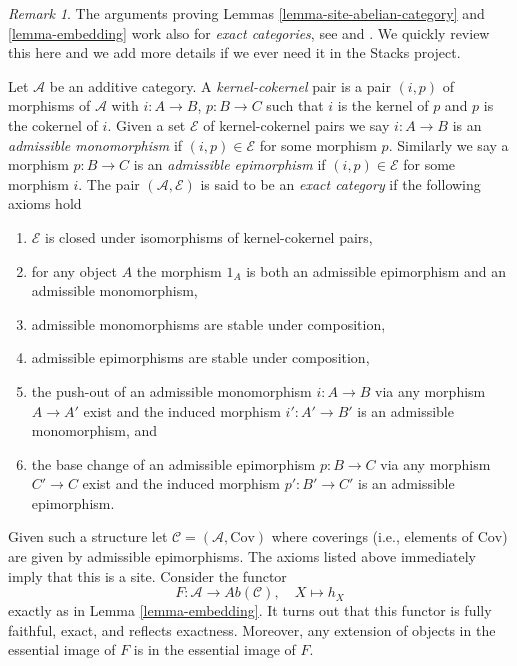 \documentclass{stacks-project}
\theoremstyle{plain}
\theoremstyle{definition}
\theoremstyle{remark}
\newtheorem{remark}[subsection]{Remark}
\numberwithin{equation}{subsection}
\begin{document}
\begin{remark}
\label{remark-embed-exact-category}
The arguments proving
Lemmas \ref{lemma-site-abelian-category} and
\ref{lemma-embedding}
work also for {\it exact categories}, see
\cite[Appendix A]{Buhler} and
\cite[1.1.4]{BBD}.
We quickly review this here and we add more details if we ever
need it in the Stacks project.

\medskip\noindent
Let $\mathcal{A}$ be an additive category.
A {\it kernel-cokernel} pair is a pair $(i, p)$
of morphisms of $\mathcal{A}$ with
$i : A \to B$, $p : B \to C$ such that $i$ is the kernel of
$p$ and $p$ is the cokernel of $i$.
Given a set $\mathcal{E}$ of kernel-cokernel pairs we say
$i : A \to B$ is an {\it admissible monomorphism}
if $(i, p) \in \mathcal{E}$ for some morphism $p$.
Similarly we say a morphism $p : B \to C$ is an {\it admissible epimorphism}
if $(i, p) \in \mathcal{E}$ for some morphism $i$.
The pair $(\mathcal{A}, \mathcal{E})$ is said to be an
{\it exact category} if the following axioms hold
\begin{enumerate}
\item $\mathcal{E}$ is closed under isomorphisms of kernel-cokernel
pairs,
\item for any object $A$ the morphism $1_A$ is both an admissible epimorphism
and an admissible monomorphism,
\item admissible monomorphisms are stable under composition,
\item admissible epimorphisms are stable under composition,
\item the push-out of an admissible monomorphism $i : A \to B$ via
any morphism $A \to A'$ exist and the induced morphism $i' : A' \to B'$
is an admissible monomorphism, and
\item the base change of an admissible epimorphism $p : B \to C$ via
any morphism $C' \to C$ exist and the induced morphism $p' : B' \to C'$
is an admissible epimorphism.
\end{enumerate}
Given such a structure let $\mathcal{C} = (\mathcal{A}, \text{Cov})$
where coverings (i.e., elements of $\text{Cov}$) are given by
admissible epimorphisms. The axioms listed above
immediately imply that this is a site. Consider the functor
$$
F : \mathcal{A} \longrightarrow \textit{Ab}(\mathcal{C}), \quad
X \longmapsto h_X
$$
exactly as in
Lemma \ref{lemma-embedding}.
It turns out that this functor is fully faithful, exact, and reflects
exactness. Moreover, any extension of objects in the essential image
of $F$ is in the essential image of $F$.
\end{remark}
\end{document}
